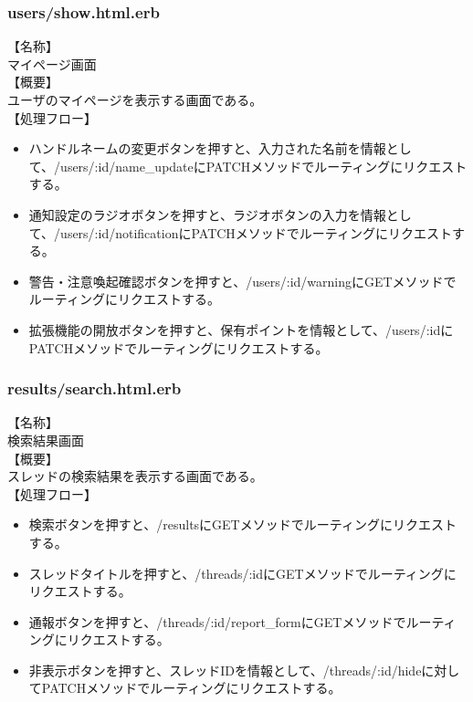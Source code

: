 \documentclass[a4j]{jarticle}
\begin{document}
\subsubsection{users/show.html.erb}
\noindent
【名称】\\
マイページ画面\\
【概要】\\
ユーザのマイページを表示する画面である。\\
【処理フロー】
\begin{itemize}
  \item ハンドルネームの変更ボタンを押すと、入力された名前を情報として、/users/:id/name\_updateにPATCHメソッドでルーティングにリクエストする。
  \item 通知設定のラジオボタンを押すと、ラジオボタンの入力を情報として、/users/:id/notificationにPATCHメソッドでルーティングにリクエストする。
  \item 警告・注意喚起確認ボタンを押すと、/users/:id/warningにGETメソッドでルーティングにリクエストする。
  \item 拡張機能の開放ボタンを押すと、保有ポイントを情報として、/users/:idにPATCHメソッドでルーティングにリクエストする。
\end{itemize}

\subsubsection{results/search.html.erb}
\noindent
【名称】\\
検索結果画面\\
【概要】\\
スレッドの検索結果を表示する画面である。\\
【処理フロー】
\begin{itemize}
  \item 検索ボタンを押すと、/resultsにGETメソッドでルーティングにリクエストする。
  \item スレッドタイトルを押すと、/threads/:idにGETメソッドでルーティングにリクエストする。
  \item 通報ボタンを押すと、/threads/:id/report\_formにGETメソッドでルーティングにリクエストする。
  \item 非表示ボタンを押すと、スレッドIDを情報として、/threads/:id/hideに対してPATCHメソッドでルーティングにリクエストする。
\end{itemize}
\end{document}

